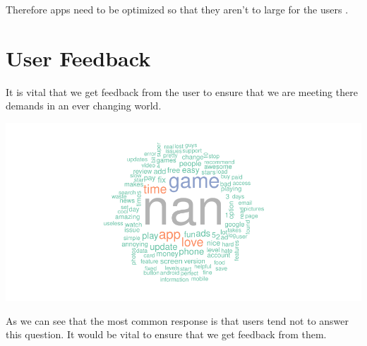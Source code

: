 \documentclass[11pt,preprint, authoryear]{elsarticle}
\let\origfigure\figure
\let\endorigfigure\endfigure
\renewenvironment{figure}[1][2] {
    \expandafter\origfigure\expandafter[H]
} {
    \endorigfigure
}
\numberwithin{equation}{section}
\numberwithin{figure}{section}
\numberwithin{table}{section}
\begin{document}
Therefore apps need to be optimized so that they aren't to large for the
users .

\hypertarget{user-feedback}{%
\section{User Feedback}\label{user-feedback}}

It is vital that we get feedback from the user to ensure that we are
meeting there demands in an ever changing world.

\begin{figure}[H]

{\centering \includegraphics{Q5_files/figure-latex/Figure5-1} 

}

\caption{User Reviews  \label{Figure5}}\label{fig:Figure5}
\end{figure}

As we can see that the most common response is that users tend not to
answer this question. It would be vital to ensure that we get feedback
from them.
\end{document}
